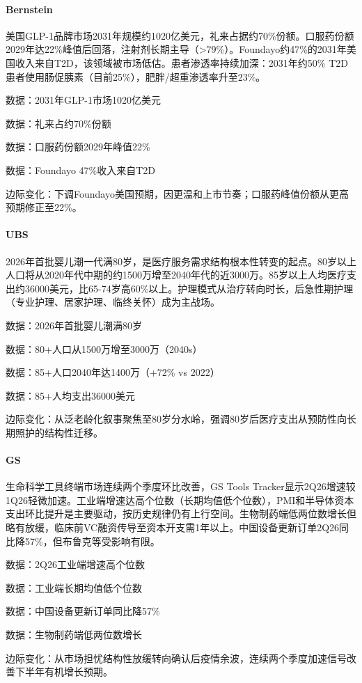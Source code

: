 \documentclass[11pt]{ctexart}
\begin{document}
\paragraph{Bernstein} 美国GLP-1品牌市场2031年规模约1020亿美元，礼来占据约70\%份额。口服药份额2029年达22\%峰值后回落，注射剂长期主导（>79\%）。Foundayo约47\%的2031年美国收入来自T2D，该领域被市场低估。患者渗透率持续加深：2031年约50\% T2D患者使用肠促胰素（目前25\%），肥胖/超重渗透率升至23\%。
{\small\color{refgray}数据：2031年GLP-1市场1020亿美元\par}
{\small\color{refgray}数据：礼来占约70\%份额\par}
{\small\color{refgray}数据：口服药份额2029年峰值22\%\par}
{\small\color{refgray}数据：Foundayo 47\%收入来自T2D\par}
{\small\color{refgray}边际变化：下调Foundayo美国预期，因更温和上市节奏；口服药峰值份额从更高预期修正至22\%。\par}
\paragraph{UBS} 2026年首批婴儿潮一代满80岁，是医疗服务需求结构根本性转变的起点。80岁以上人口将从2020年代中期的约1500万增至2040年代的近3000万。85岁以上人均医疗支出约36000美元，比65-74岁高60\%以上。护理模式从治疗转向时长，后急性期护理（专业护理、居家护理、临终关怀）成为主战场。
{\small\color{refgray}数据：2026年首批婴儿潮满80岁\par}
{\small\color{refgray}数据：80+人口从1500万增至3000万（2040s）\par}
{\small\color{refgray}数据：85+人口2040年达1400万（+72\% vs 2022）\par}
{\small\color{refgray}数据：85+人均支出36000美元\par}
{\small\color{refgray}边际变化：从泛老龄化叙事聚焦至80岁分水岭，强调80岁后医疗支出从预防性向长期照护的结构性迁移。\par}
\paragraph{GS} 生命科学工具终端市场连续两个季度环比改善，GS Tools Tracker显示2Q26增速较1Q26轻微加速。工业端增速达高个位数（长期均值低个位数），PMI和半导体资本支出环比提升是主要驱动，按历史规律仍有上行空间。生物制药端低两位数增长但略有放缓，临床前VC融资传导至资本开支需1年以上。中国设备更新订单2Q26同比降57\%，但布鲁克等受影响有限。
{\small\color{refgray}数据：2Q26工业端增速高个位数\par}
{\small\color{refgray}数据：工业端长期均值低个位数\par}
{\small\color{refgray}数据：中国设备更新订单同比降57\%\par}
{\small\color{refgray}数据：生物制药端低两位数增长\par}
{\small\color{refgray}边际变化：从市场担忧结构性放缓转向确认后疫情余波，连续两个季度加速信号改善下半年有机增长预期。\par}
\end{document}
